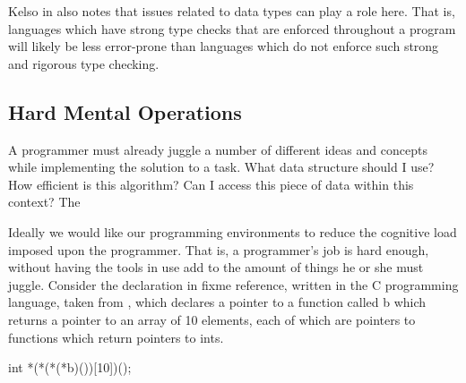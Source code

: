 Kelso in \cite{Kelso02} also notes that issues related to data types can play a role here.  That is, languages which have strong type checks that are enforced throughout a program will likely be less error-prone than languages which do not enforce such strong and rigorous type checking.

\subsection{Hard Mental Operations}
\label{hardmentalopsoutline}

A programmer must already juggle a number of different ideas and concepts while implementing the solution to a task.  What data structure should I use?  How efficient is this algorithm?  Can I access this piece of data within this context?  The 

Ideally we would like our programming environments to reduce the cognitive load imposed upon the programmer.  That is, a programmer's job is hard enough, without having the tools in use add to the amount of things he or she must juggle.  Consider the declaration in fixme reference, written in the C programming language, taken from \cite{Giguere87}, which declares a pointer to a function called b which returns a pointer to an array of 10 elements, each of which are pointers to functions which return pointers to ints.

int *(*(*(*b)())[10])();

\begin{comment}
int *(*list[ MAX ])();

which declares an array called list with MAX elements, each of which are pointers to functions which return pointers to ints.  Giguere explains how one can mentally parse this declaration as:

Step 1, the identifier is list (MAX is the array size), write ``declare list as''. Step 2, array on the right. Step 3, write ``array MAX of''. Step 4, pointer on the left. Step 5, write ``pointer to''. Step 6, parenthesized expression, goto step 2. Step 2, function on the right. Step 3, write ``function returning''. Step 4, pointer on the left. Step 5, write ``pointer to''. Step 6, complete declarator. Step 7, write ``int''. Stop.

The declaration is: ``declare list as array MAX of pointer to function returning pointer to int''.
\end{comment}


